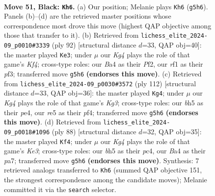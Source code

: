 \documentclass[11pt]{article}
\begin{document}
\clearpage

\begin{figure}[p]\centering
\begin{subfigure}{0.46\textwidth}\centering
\resizebox{\linewidth}{!}{%
\newchessgame
\chessboard[
  setfen={r7/8/pp6/4R1kB/bP1r4/P6K/8/5R2 b - - 5 51},
  showmover=false,
  pgfstyle=straightmove, color=movearrow, markmove={g5-h6}
]}
\caption{}
\end{subfigure}\hfill
\begin{subfigure}{0.46\textwidth}\centering
\resizebox{\linewidth}{!}{%
\newchessgame
\chessboard[
  setfen={5r2/2P3p1/8/3k4/4pK2/5p1P/5P2/2R5 w - - 4 47},
  showmover=false,
  pgfstyle=straightmove, color=movearrow, markmove={f4-e3}
]}
\caption{}
\end{subfigure}
\\[4pt]
\begin{subfigure}{0.46\textwidth}\centering
\resizebox{\linewidth}{!}{%
\newchessgame
\chessboard[
  setfen={7r/P7/2R3p1/1P2k1P1/4pp2/6K1/4B3/8 w - - 0 57},
  showmover=false,
  pgfstyle=straightmove, color=movearrow, markmove={g3-g4}
]}
\caption{}
\end{subfigure}\hfill
\begin{subfigure}{0.46\textwidth}\centering
\resizebox{\linewidth}{!}{%
\newchessgame
\chessboard[
  setfen={8/p6p/5k2/8/2p3P1/3rK2P/P1R5/8 w - - 3 45},
  showmover=false,
  pgfstyle=straightmove, color=movearrow, markmove={e3-f4}
]}
\caption{}
\end{subfigure}
\caption{\textbf{Move 51, Black: \texttt{Kh6}.} (a) Our position; Melanie plays \texttt{Kh6} (\texttt{g5h6}). Panels (b)--(d) are the retrieved master positions whose correspondence most drove this move (highest QAP objective among those that transfer to it). (b) Retrieved from \texttt{lichess\_elite\_2024-09\_p0010\#3339} (ply 92) [structural distance $d$=33, QAP obj=40]: the master played \texttt{Ke3}; under $\mu$ our \emph{Kg4} plays the role of that game's \emph{Kf4}; cross-type roles: our \emph{B}a4 as their \emph{P}f2, our \emph{r}f1 as their \emph{p}f3; transferred move \texttt{g5h6} \textbf{(endorses this move)}. (c) Retrieved from \texttt{lichess\_elite\_2024-09\_p0030\#3572} (ply 112) [structural distance $d$=33, QAP obj=36]: the master played \texttt{Kg4}; under $\mu$ our \emph{Kg4} plays the role of that game's \emph{Kg3}; cross-type roles: our \emph{b}h5 as their \emph{p}e4, our \emph{r}e5 as their \emph{p}f4; transferred move \texttt{g5h6} \textbf{(endorses this move)}. (d) Retrieved from \texttt{lichess\_elite\_2024-09\_p0018\#1096} (ply 88) [structural distance $d$=32, QAP obj=35]: the master played \texttt{Kf4}; under $\mu$ our \emph{Kg4} plays the role of that game's \emph{Ke3}; cross-type roles: our \emph{b}h5 as their \emph{p}c4, our \emph{B}a4 as their \emph{p}a7; transferred move \texttt{g5h6} \textbf{(endorses this move)}. Synthesis: 7 retrieved analogs transferred to \texttt{Kh6} (summed QAP objective 151, the strongest correspondence among the candidate moves); Melanie committed it via the \texttt{search} selector.}
\label{fig:thought-m101}
\end{figure}
\end{document}
